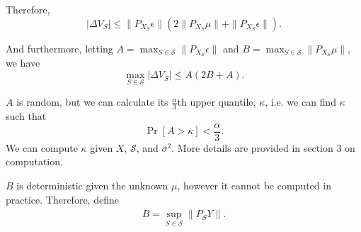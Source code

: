 \documentclass[12pt]{article}
\begin{document}
Therefore,
\[
|\Delta V_S| \leq \|P_{X_S} \epsilon\|(2 \|P_{X_S} \mu\| + \|P_{X_S}\epsilon \|).
\]

And furthermore, letting $A = \max_{S \in \mathcal{S}} \|P_{X_S} \epsilon\|$ and $B =  \max_{S \in \mathcal{S}} \|P_{X_S} \mu\|$,
we have
\[
\max_{S \in \mathcal{S}} |\Delta V_S| \leq A(2 B + A).
\]

$A$ is random, but we can calculate its $\frac{\alpha}{3}$th upper quantile, $\kappa$, i.e. we can find $\kappa$ such that
\[
\Pr[A > \kappa] < \frac{\alpha}{3}.
\]
We can compute $\kappa$ given $X$, $\mathcal{S}$, and $\sigma^2$.  More details are provided in section 3 on computation.

$B$ is deterministic given the unknown $\mu$, however it cannot be computed in practice.  Therefore, define
\[
\hat{B} = \sup_{S \in \mathcal{S}} \|P_S Y\|.
\]
\end{document}
